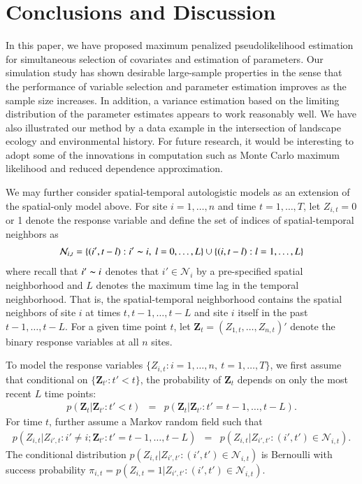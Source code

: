 \documentclass[authoryear,review, 12pt]{elsarticle}
\begin{document}
\section{Conclusions and Discussion}
\label{sec:disc}

In this paper, we have proposed maximum penalized pseudolikelihood estimation for simultaneous selection of covariates and estimation of parameters. Our simulation study has shown desirable large-sample properties in the sense that the performance of variable selection and parameter estimation improves as the sample size increases.  In addition, a variance estimation based on the limiting distribution of the parameter estimates appears to work reasonably well.  We have also illustrated our method by a data example in the intersection of landscape ecology and environmental history.  
For future research, it would be interesting to adopt some of the innovations in computation such as Monte Carlo maximum likelihood and reduced dependence approximation.

We may further consider spatial-temporal autologistic models as an extension of the spatial-only model above. For site $i=1,\ldots,n$ and time $t=1,\ldots,T$, let $Z_{i,t}=0$ or 1 denote the response variable and define the set of indices of spatial-temporal neighbors as
\begin{eqnarray}
\mathcal{N}_{i,t}=\{(i',t-l):i'\thicksim i,\ l=0,\ldots,L\}\cup\{(i,t-l): l=1,\ldots,L\}
\end{eqnarray}
where recall that $i'\thicksim i$ denotes that $i'\in\mathcal{N}_i$ by a pre-specified spatial neighborhood and $L$ denotes the maximum time lag in the temporal neighborhood.  That is, the spatial-temporal neighborhood contains the spatial neighbors of site $i$ at times $t, t-1, \ldots, t-L$ and site $i$ itself in the past $t-1, \ldots, t-L$.  For a given time point $t$, let $\bm{Z}_t=(Z_{1,t},\ldots, Z_{n,t})'$ denote the binary response variables at all $n$ sites.  

To model the response variables $\{Z_{i,t}: i=1,\dots,n,\ t=1,\dots,T\}$, we first assume that conditional on $\{\bm{Z}_{t'}: t'<t\}$, the probability of $\bm{Z}_t$ depends on only the most recent $L$ time points:
\begin{eqnarray}
p(\bm{Z}_t|\bm{Z}_{t'}: t'<t) &=& p(\bm{Z}_t|\bm{Z}_{t'}: t'=t-1,\ldots,t-L).
\label{eqn:stMarkov}
\end{eqnarray}
For time $t$, further assume a Markov random field such that
\begin{eqnarray}
p(Z_{i,t}|Z_{i',t}: i'\neq i; \bm{Z}_{t'}: t'=t-1,\ldots,t-L) &=& p(Z_{i,t}|Z_{i',t'}: (i',t')\in\mathcal{N}_{i,t}).
\label{eqn:stMRF}
\end{eqnarray}
The conditional distribution $p(Z_{i,t}|Z_{i',t'}: (i',t')\in\mathcal{N}_{i,t})$ is Bernoulli with success probability $\pi_{i,t}=p(Z_{i,t}=1|Z_{i',t'}: (i',t')\in\mathcal{N}_{i,t})$.  
\end{document}
